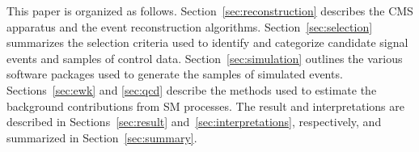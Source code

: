 

This paper is organized as follows. Section~\ref{sec:reconstruction}
describes the CMS apparatus and the event reconstruction
algorithms. Section~\ref{sec:selection} summarizes the selection
criteria used to identify and categorize candidate signal events and
samples of control data. Section~\ref{sec:simulation} outlines the
various software packages used to generate the samples of simulated
events. Sections~\ref{sec:ewk} and \ref{sec:qcd} describe the methods
used to estimate the background contributions from SM processes. The
result and interpretations are described in Sections~\ref{sec:result}
and~\ref{sec:interpretations}, respectively, and summarized in
Section~\ref{sec:summary}.

